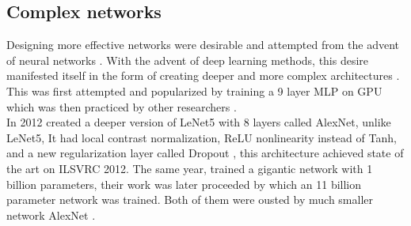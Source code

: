 \documentclass{article} \usepackage{lets_keepit_simple,times}
\begin{document}
\subsection{Complex networks}
Designing more effective networks were desirable and attempted from the advent of neural networks \cite{Fukushima_Neocognitron_Beginning_1979, Fukushima_Neocognitron_Self_Orgenizing_NN_1980, Ivankhnenko_Polynomial_theory_1971}. With the advent of deep learning methods, this desire manifested itself in the form of creating deeper and more complex architectures \cite{Ciresan_Deep_big_simple_nn_2010, Ciresan_A_committee_of_nn_2011, Ciresan_Multi_colmn_dnn_traffic_sign_2012, He_ResNet_2015, AlexKrizhevsky_imgnet_2012, Simonyan_VGG_2014, Srivastava_HighwayNets_2015, Szegedy_googlenet_2015, Zagoruyko_WRN_2016}. This was first attempted and popularized by \cite{Ciresan_Deep_big_simple_nn_2010} training a 9 layer MLP on GPU which was then practiced by other researchers \cite{ Ciresan_A_committee_of_nn_2011, Ciresan_Multi_colmn_dnn_traffic_sign_2012, Ciregan_Multi_column_dnn_img_cls_2012, He_ResNet_2015, AlexKrizhevsky_imgnet_2012, Simonyan_VGG_2014, Srivastava_HighwayNets_2015, Szegedy_googlenet_2015, Zagoruyko_WRN_2016}.\\
In 2012 \cite{AlexKrizhevsky_imgnet_2012} created a deeper version of LeNet5 \cite{Lecun_GradientBased_CNN_1998} with 8 layers called AlexNet, unlike LeNet5, It had local contrast normalization, ReLU \cite{Nair_ReLU_RBM_2010} nonlinearity instead of Tanh, and a new regularization layer called Dropout \cite{Hinton_preventingCoAdapt_2012}, this architecture achieved state of the art on ILSVRC 2012. The same year, \cite{Le_Building_HighlevelFeats_2013} trained a gigantic network with 1 billion parameters, their work was later proceeded by \cite{Coates_deepLearning_COTS_HPC_2013} which an 11 billion parameter network was trained. Both of them were ousted by much smaller network AlexNet  \cite{AlexKrizhevsky_imgnet_2012}.\\
\end{document}
